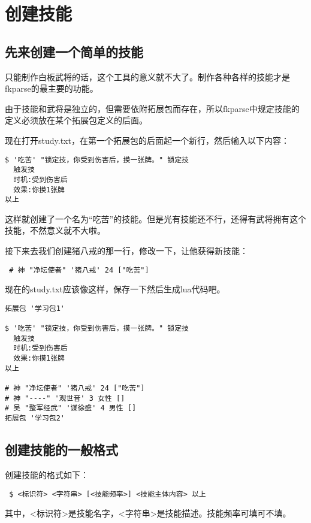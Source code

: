 \chapter{创建技能}

\section{先来创建一个简单的技能}

只能制作白板武将的话，这个工具的意义就不大了。制作各种各样的技能才是fkparse的最主要的功能。

由于技能和武将是独立的，但需要依附拓展包而存在，所以fkparse中规定技能的定义必须放在某个拓展包定义的后面。

现在打开study.txt，在第一个拓展包的后面起一个新行，然后输入以下内容：

\begin{verbatim}
$ '吃苦' "锁定技，你受到伤害后，摸一张牌。" 锁定技
  触发技
  时机:受到伤害后
  效果:你摸1张牌
以上
\end{verbatim}

这样就创建了一个名为“吃苦”的技能。但是光有技能还不行，还得有武将拥有这个技能，不然意义就不大啦。

接下来去我们创建猪八戒的那一行，修改一下，让他获得新技能：

\begin{verbatim}
 # 神 "净坛使者" '猪八戒' 24 ["吃苦"]
\end{verbatim}

现在的study.txt应该像这样，保存一下然后生成lua代码吧。

\begin{verbatim}
拓展包 '学习包1'

$ '吃苦' "锁定技，你受到伤害后，摸一张牌。" 锁定技
  触发技
  时机:受到伤害后
  效果:你摸1张牌
以上

# 神 "净坛使者" '猪八戒' 24 ["吃苦"]
# 神 "----" '观世音' 3 女性 []
# 吴 "整军经武" '谋徐盛' 4 男性 []
拓展包 '学习包2'
\end{verbatim}

\section{创建技能的一般格式}

创建技能的格式如下：

\begin{verbatim}
 $ <标识符> <字符串> [<技能频率>] <技能主体内容> 以上
\end{verbatim}

其中，<标识符>是技能名字，<字符串>是技能描述。技能频率可填可不填。

